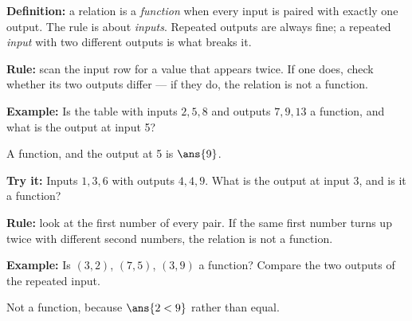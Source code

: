 \documentclass[12pt]{article}
\begin{document}

\begin{formulabox}
\textbf{Definition:} a relation is a \emph{function} when every input is
paired with exactly one output. The rule is about \emph{inputs}. Repeated
outputs are always fine; a repeated \emph{input} with two different outputs is
what breaks it.
\end{formulabox}


\begin{formulabox}
\textbf{Rule:} scan the input row for a value that appears twice. If one does,
check whether its two outputs differ --- if they do, the relation is not a
function.
\end{formulabox}

\begin{examplebox}
\textbf{Example:} \quad Is the table with inputs $2, 5, 8$ and outputs
$7, 9, 13$ a function, and what is the output at input 5?

A function, and the output at 5 is $\ans{9}$.
\end{examplebox}

\begin{tryitbox}
\textbf{Try it:} \quad Inputs $1, 3, 6$ with outputs $4, 4, 9$. What is the
output at input 3, and is it a function?\\[2pt]
\end{tryitbox}


\begin{formulabox}
\textbf{Rule:} look at the first number of every pair. If the same first
number turns up twice with different second numbers, the relation is not a
function.
\end{formulabox}

\begin{examplebox}
\textbf{Example:} \quad Is $(3, 2)$, $(7, 5)$, $(3, 9)$ a function? Compare
the two outputs of the repeated input.

Not a function, because $\ans{2 < 9}$ rather than equal.
\end{examplebox}
\end{document}
